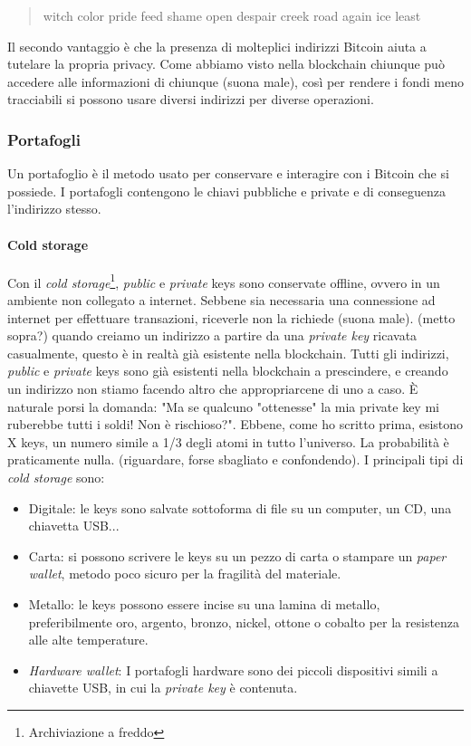 \documentclass {article}
\begin{document}
\begin{quote}

witch color pride feed shame open despair creek road again ice least

\end{quote}
%
Il secondo vantaggio è che la presenza di molteplici indirizzi Bitcoin aiuta a tutelare la propria privacy.
Come abbiamo visto nella blockchain chiunque può accedere alle informazioni di chiunque (suona male), così per rendere i fondi meno tracciabili si possono usare diversi indirizzi per diverse operazioni.


\subsubsection {Portafogli}


Un portafoglio è il metodo usato per conservare e interagire con i Bitcoin che si possiede.
I portafogli contengono le chiavi pubbliche e private e di conseguenza l'indirizzo stesso.

\paragraph {Cold storage}

Con il \textit{cold storage}\footnote{Archiviazione a freddo}, \textit{public} e \textit{private} keys sono conservate offline, ovvero in un ambiente non collegato a internet.
Sebbene sia necessaria una connessione ad internet per effettuare transazioni, riceverle non la richiede (suona male).
(metto sopra?) quando creiamo un indirizzo a partire da una \textit{private key} ricavata casualmente, questo è in realtà già esistente nella blockchain.
Tutti gli indirizzi, \textit{public} e \textit{private} keys sono già esistenti nella blockchain a prescindere, e creando un indirizzo non stiamo facendo altro che appropriarcene di uno a caso.
È naturale porsi la domanda: "Ma se qualcuno "ottenesse" la mia private key mi ruberebbe tutti i soldi! Non è rischioso?".
Ebbene, come ho scritto prima, esistono X keys, un numero simile a 1/3 degli atomi in tutto l'universo. La probabilità è praticamente nulla. (riguardare, forse sbagliato e confondendo).
I principali tipi di \textit{cold storage} sono:

\begin{itemize}
\item Digitale: le keys sono salvate sottoforma di file su un computer, un CD, una chiavetta USB...
\item Carta: si possono scrivere le keys su un pezzo di carta o stampare un \textit{paper wallet}, metodo poco sicuro per la fragilità del materiale.
\item Metallo: le keys possono essere incise su una lamina di metallo, preferibilmente oro, argento, bronzo, nickel, ottone o cobalto per la resistenza alle alte temperature.
\item \textit{Hardware wallet}: I portafogli hardware sono dei piccoli dispositivi simili a chiavette USB, in cui la \textit{private key} è contenuta.
\end{itemize}
\end{document}
